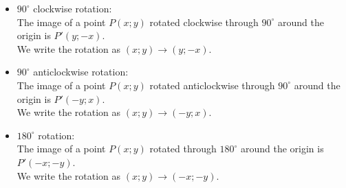 \begin{minipage}{0.55\textwidth}
\begin{itemize}
\item 
$90^\circ$ clockwise rotation:\\
The image of a point $P(x;y)$ rotated clockwise through $90^\circ$ around the origin is $P'(y; - x)$.\\
We write the rotation as $(x;y) \rightarrow (y; -x)$.
\vspace{2cm}
\item
$90^\circ$ anticlockwise rotation:\\
The image of a point $P(x;y)$ rotated anticlockwise through $90^\circ$ around the origin is $P'(-y; x)$.\\
We write the rotation as $(x;y) \rightarrow (-y; x)$.
\vspace{2cm}
\item
$180^\circ$ rotation:\\
The image of a point $P(x;y)$ rotated through $180^\circ$ around the origin is $P'(-x; -y)$.\\
We write the rotation as $(x;y) \rightarrow (-x; -y)$.
\end{itemize}
\end{minipage}
